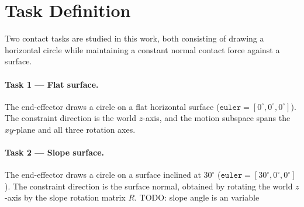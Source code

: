 \documentclass[
	german,%
	accentcolor=9c,%
	ruledheaders=section,%
	class=report,%
	thesis={type=bachelor},%
	fontsize=11pt,%
	parskip=half-,%
	custommargins=true,%
	marginpar=false,%
]{tudapub}
\begin{document}
\section{Task Definition}

Two contact tasks are studied in this work, both consisting of drawing a
horizontal circle while maintaining a constant normal contact force against a
surface.

\paragraph{Task 1 — Flat surface.}
The end-effector draws a circle on a flat horizontal surface
(\(\texttt{euler} = [0^\circ, 0^\circ, 0^\circ]\)).
The constraint direction is the world \(z\)-axis, and the motion subspace
spans the \(xy\)-plane and all three rotation axes.

\paragraph{Task 2 — Slope surface.}
The end-effector draws a circle on a surface inclined at \(30^\circ\)
(\(\texttt{euler} = [30^\circ, 0^\circ, 0^\circ]\)).
The constraint direction is the surface normal, obtained by rotating the
world \(z\)-axis by the slope rotation matrix \(R\).
TODO: slope angle is an variable
\end{document}
